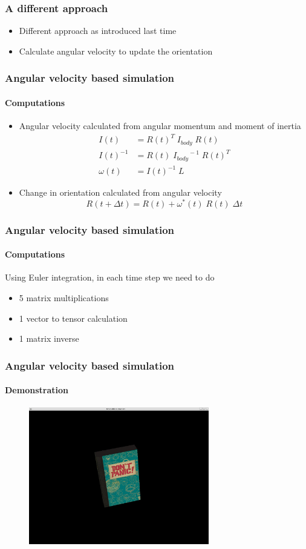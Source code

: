 \documentclass{beamer}
\begin{document}
\begin{frame}
 \frametitle{A different approach}
 \begin{itemize}
  \item Different approach as introduced last time
  \item Calculate angular velocity to update the orientation
 \end{itemize}
\end{frame}

\begin{frame}
 \frametitle{Angular velocity based simulation}
 \framesubtitle{Computations}
 \begin{itemize}
  \item Angular velocity calculated from angular momentum and moment of inertia
  \begin{align*}
  I(t) &= R(t)^T \; I_{body} \; R(t) \\
  I(t)^{-1} &= R(t) \; {I_{body}}^{\!\!-1} \; R(t)^T \\
  \omega(t) &= I(t)^{-1} \; L
  \end{align*}
  \item Change in orientation calculated from angular velocity
  \begin{displaymath}
  R(t + \Delta t) = R(t) + \omega^*\!(t) \; R(t)  \;  \Delta t
  \end{displaymath}
 \end{itemize}
\end{frame}

\begin{frame}
 \frametitle{Angular velocity based simulation}
 \framesubtitle{Computations}
 Using Euler integration, in each time step we need to do
 \begin{itemize}
  \item 5 matrix multiplications
  \item 1 vector to tensor calculation
  \item 1 matrix inverse
 \end{itemize}
\end{frame}

\begin{frame}
 \frametitle{Angular velocity based simulation}
 \framesubtitle{Demonstration}
 \begin{figure}
  \centering
  \includegraphics[width=0.7\textwidth]{demo.jpg}
 \end{figure}
\end{frame}
\end{document}
